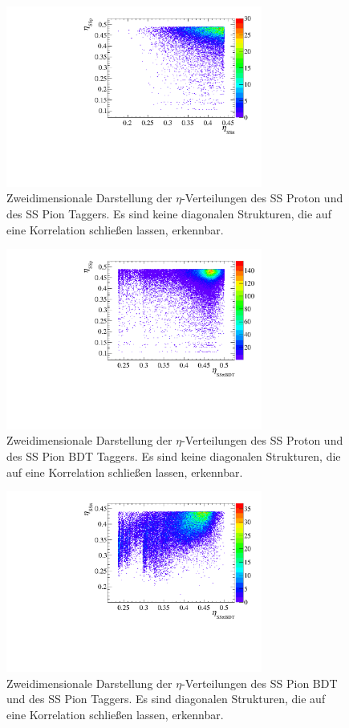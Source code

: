 \begin{figure}[htbp]
	\centering
		\includegraphics[width=0.75\textwidth]{fig/SSp_SSpi.pdf}
	\caption{Zweidimensionale Darstellung der $\eta$-Verteilungen des SS Proton und des SS Pion Taggers. Es sind keine diagonalen Strukturen, die auf eine Korrelation schließen lassen, erkennbar.}
	\label{fig:SSp_SSpi} 
\end{figure}
\begin{figure}[htbp]
	\centering
		\includegraphics[width=0.75\textwidth]{fig/SSp_SSpiBDT.pdf}
	\caption{Zweidimensionale Darstellung der $\eta$-Verteilungen des SS Proton und des SS Pion BDT Taggers. Es sind keine diagonalen Strukturen, die auf eine Korrelation schließen lassen, erkennbar.}
	\label{fig:SSp_SSpiBDT} 
\end{figure}
\begin{figure}[htbp]
	\centering
		\includegraphics[width=0.75\textwidth]{fig/SSpi_SSpiBDT.pdf}
	\caption{Zweidimensionale Darstellung der $\eta$-Verteilungen des SS Pion BDT und des SS Pion Taggers. Es sind diagonalen Strukturen, die auf eine Korrelation schließen lassen, erkennbar.}
	\label{fig:SSpi_SSpiBDT} 
\end{figure}
